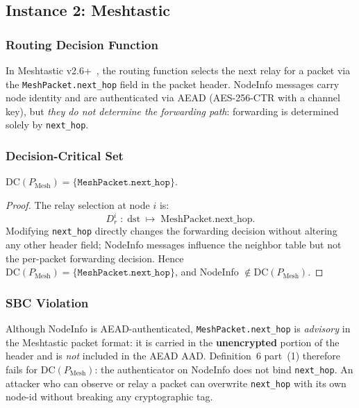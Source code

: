 \subsection{Instance 2: Meshtastic}
\label{sec:instances-mesh}

\subsubsection*{Routing Decision Function}

In Meshtastic v2.6+~\cite{meshtastic2024}, the routing function selects the
next relay for a packet via the \texttt{MeshPacket.next\_hop} field in the
packet header.
NodeInfo messages carry node identity and are authenticated via AEAD
(AES-256-CTR with a channel key), but \emph{they do not determine the
forwarding path}: forwarding is determined solely by \texttt{next\_hop}.

\subsubsection*{Decision-Critical Set}

\begin{proposition}
$\mathrm{DC}(P_{\mathrm{Mesh}}) = \{\texttt{MeshPacket.next\_hop}\}$.
\end{proposition}

\begin{proof}
The relay selection at node $i$ is:
\[
  D_{r}^{i} \;:\; \mathrm{dst} \;\mapsto\; \mathrm{MeshPacket.next\_hop}.
\]
Modifying \texttt{next\_hop} directly changes the forwarding decision without
altering any other header field; NodeInfo messages influence the
neighbor table but not the per-packet forwarding decision.
Hence $\mathrm{DC}(P_{\mathrm{Mesh}}) = \{\texttt{MeshPacket.next\_hop}\}$,
and NodeInfo $\notin \mathrm{DC}(P_{\mathrm{Mesh}})$.
\end{proof}

\subsubsection*{SBC Violation}

Although NodeInfo is AEAD-authenticated, \texttt{MeshPacket.next\_hop} is
\emph{advisory} in the Meshtastic packet format: it is carried in the
\textbf{unencrypted} portion of the header and is \emph{not} included in the
AEAD AAD.
Definition~6 part~(1) therefore fails for $\mathrm{DC}(P_{\mathrm{Mesh}})$:
the authenticator on NodeInfo does not bind \texttt{next\_hop}.
An attacker who can observe or relay a packet can overwrite \texttt{next\_hop}
with its own node-id without breaking any cryptographic tag.

